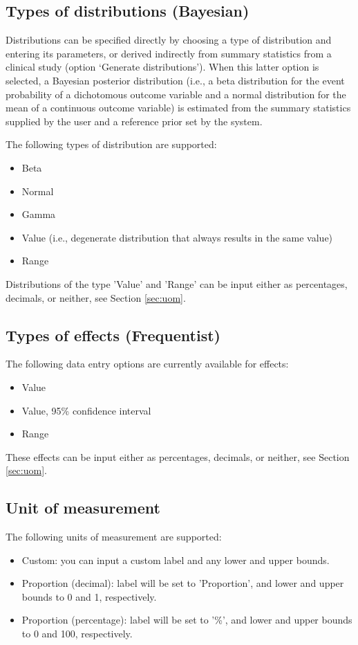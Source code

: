 \documentclass[00_mcda_tutorial.tex]{subfiles}
\begin{document}
\subsection*{Types of distributions (Bayesian)}
Distributions can be specified directly by choosing a type of distribution and entering its parameters, or derived indirectly from summary statistics from a clinical study (option ‘Generate distributions’). When this latter option is selected, a Bayesian posterior distribution (i.e., a beta distribution for the event probability of a dichotomous outcome variable and a normal distribution for the mean of a continuous outcome variable) is estimated from the summary statistics supplied by the user and a reference prior set by the system.
\newline

\noindent The following types of distribution are supported:
\begin{itemize}
    \item Beta
    \item Normal
    \item Gamma
    \item Value (i.e., degenerate distribution that always results in the same value)
    \item Range
\end{itemize}

\noindent Distributions of the type 'Value' and 'Range' can be input either as percentages, decimals, or neither, see Section \ref{sec:uom}.

\subsection*{Types of effects (Frequentist)}
The following data entry options are currently available for effects:
\begin{itemize}
    \item Value
    \item Value, 95\% confidence interval
    \item Range
\end{itemize}

\noindent These effects can be input either as percentages, decimals, or neither, see Section \ref{sec:uom}.

\subsection*{Unit of measurement}
\label{sec:uom}
The following units of measurement are supported:
\begin{itemize}
    \item Custom: you can input a custom label and any lower and upper bounds.
    \item Proportion (decimal): label will be set to 'Proportion', and lower and upper bounds to 0 and 1, respectively.
    \item Proportion (percentage): label will be set to '\%', and lower and upper bounds to 0 and 100, respectively.
\end{itemize}
\end{document}
